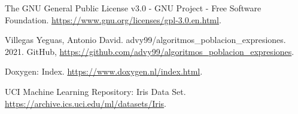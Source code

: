 \begin{thebibliography}{9}

	The GNU General Public License v3.0 - GNU Project - Free Software Foundation. \url{https://www.gnu.org/licenses/gpl-3.0.en.html}.


	Villegas Yeguas, Antonio David. advy99/algoritmos\_poblacion\_expresiones. 2021. GitHub, \url{https://github.com/advy99/algoritmos_poblacion_expresiones}.


	Doxygen: Index. \url{https://www.doxygen.nl/index.html}.


	UCI Machine Learning Repository: Iris Data Set. \url{https://archive.ics.uci.edu/ml/datasets/Iris}.

\end{thebibliography}
